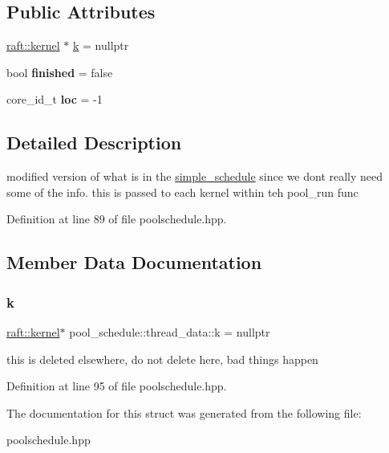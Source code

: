 \subsection*{Public Attributes}
\begin{DoxyCompactItemize}
\item 
\hyperlink{classraft_1_1kernel}{raft\+::kernel} $\ast$ \hyperlink{structpool__schedule_1_1thread__data_ada8a6411993a2c90bb16503777bf4b00}{k} = nullptr
\item 
\hypertarget{structpool__schedule_1_1thread__data_a270119c518ec32a3116934e0c6ff7f99}{}\label{structpool__schedule_1_1thread__data_a270119c518ec32a3116934e0c6ff7f99} 
bool {\bfseries finished} = false
\item 
\hypertarget{structpool__schedule_1_1thread__data_a6370a4062239e55e8baf21a631847767}{}\label{structpool__schedule_1_1thread__data_a6370a4062239e55e8baf21a631847767} 
core\+\_\+id\+\_\+t {\bfseries loc} = -\/1
\end{DoxyCompactItemize}


\subsection{Detailed Description}
modified version of what is in the \hyperlink{classsimple__schedule}{simple\+\_\+schedule} since we don\textquotesingle{}t really need some of the info. this is passed to each kernel within teh pool\+\_\+run func 

Definition at line 89 of file poolschedule.\+hpp.



\subsection{Member Data Documentation}
\hypertarget{structpool__schedule_1_1thread__data_ada8a6411993a2c90bb16503777bf4b00}{}\label{structpool__schedule_1_1thread__data_ada8a6411993a2c90bb16503777bf4b00} 
\subsubsection{\texorpdfstring{k}{k}}
{\footnotesize\ttfamily \hyperlink{classraft_1_1kernel}{raft\+::kernel}$\ast$ pool\+\_\+schedule\+::thread\+\_\+data\+::k = nullptr}

this is deleted elsewhere, do not delete here, bad things happen 

Definition at line 95 of file poolschedule.\+hpp.



The documentation for this struct was generated from the following file\+:\begin{DoxyCompactItemize}
\item 
poolschedule.\+hpp\end{DoxyCompactItemize}
